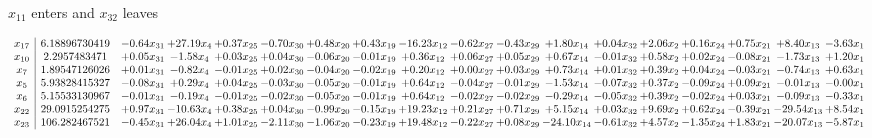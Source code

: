 \documentclass[9pt]{article}
\begin{document}
 $ x_{11} $ enters and $ x_{32} $ leaves 

 \[\begin{array}{c| c c@{\hskip 2pt} c@{\hskip 2pt} c@{\hskip 2pt} c@{\hskip 2pt} c@{\hskip 2pt} c@{\hskip 2pt} c@{\hskip 2pt} c@{\hskip 2pt} c@{\hskip 2pt} c@{\hskip 2pt} c@{\hskip 2pt} c@{\hskip 2pt} c@{\hskip 2pt} c@{\hskip 2pt} c@{\hskip 2pt} c@{\hskip 2pt} }
 x_{17}   &  6.18896730419 & -0.64 x_{31} & + 27.19 x_{4} & +  0.37 x_{25} & -0.70 x_{30} & +  0.48 x_{20} & +  0.43 x_{19} & -16.23 x_{12} & -0.62 x_{27} & -0.43 x_{29} & +  1.80 x_{14} & +  0.04 x_{32} & +  2.06 x_{2} & +  0.16 x_{24} & +  0.75 x_{21} & +  8.40 x_{13} & -3.63 x_{1}\\
 x_{10}   &  2.2957483471 & +  0.05 x_{31} & -1.58 x_{4} & +  0.03 x_{25} & +  0.04 x_{30} & -0.06 x_{20} & -0.01 x_{19} & +  0.36 x_{12} & +  0.06 x_{27} & +  0.05 x_{29} & +  0.67 x_{14} & -0.01 x_{32} & +  0.58 x_{2} & +  0.02 x_{24} & -0.08 x_{21} & -1.73 x_{13} & +  1.20 x_{1}\\
 x_{7}   &  1.89547126026 & +  0.01 x_{31} & -0.82 x_{4} & -0.01 x_{25} & +  0.02 x_{30} & -0.04 x_{20} & -0.02 x_{19} & +  0.20 x_{12} & +  0.00 x_{27} & +  0.03 x_{29} & +  0.73 x_{14} & +  0.01 x_{32} & +  0.39 x_{2} & +  0.04 x_{24} & -0.03 x_{21} & -0.74 x_{13} & +  0.63 x_{1}\\
 x_{5}   &  5.93828415327 & -0.08 x_{31} & +  0.29 x_{4} & +  0.04 x_{25} & -0.03 x_{30} & -0.05 x_{20} & -0.01 x_{19} & +  0.64 x_{12} & -0.04 x_{27} & -0.01 x_{29} & -1.53 x_{14} & -0.07 x_{32} & +  0.37 x_{2} & -0.09 x_{24} & +  0.09 x_{21} & -0.01 x_{13} & -0.00 x_{1}\\
 x_{6}   &  5.15533130967 & -0.01 x_{31} & -0.19 x_{4} & -0.01 x_{25} & -0.02 x_{30} & -0.05 x_{20} & -0.01 x_{19} & +  0.64 x_{12} & -0.02 x_{27} & -0.02 x_{29} & -0.29 x_{14} & -0.05 x_{32} & +  0.39 x_{2} & -0.02 x_{24} & +  0.03 x_{21} & -0.09 x_{13} & -0.33 x_{1}\\
 x_{22}   &  29.0915254275 & +  0.97 x_{31} & -10.63 x_{4} & +  0.38 x_{25} & +  0.04 x_{30} & -0.99 x_{20} & -0.15 x_{19} & + 19.23 x_{12} & +  0.21 x_{27} & +  0.71 x_{29} & +  5.15 x_{14} & +  0.03 x_{32} & +  9.69 x_{2} & +  0.62 x_{24} & -0.39 x_{21} & -29.54 x_{13} & +  8.54 x_{1}\\
 x_{23}   &  106.282467521 & -0.45 x_{31} & + 26.04 x_{4} & +  1.01 x_{25} & -2.11 x_{30} & -1.06 x_{20} & -0.23 x_{19} & + 19.48 x_{12} & -0.22 x_{27} & +  0.08 x_{29} & -24.10 x_{14} & -0.61 x_{32} & +  4.57 x_{2} & -1.35 x_{24} & +  1.83 x_{21} & -20.07 x_{13} & -5.87 x_{1}\\

\end{array}\]
\end{document}
